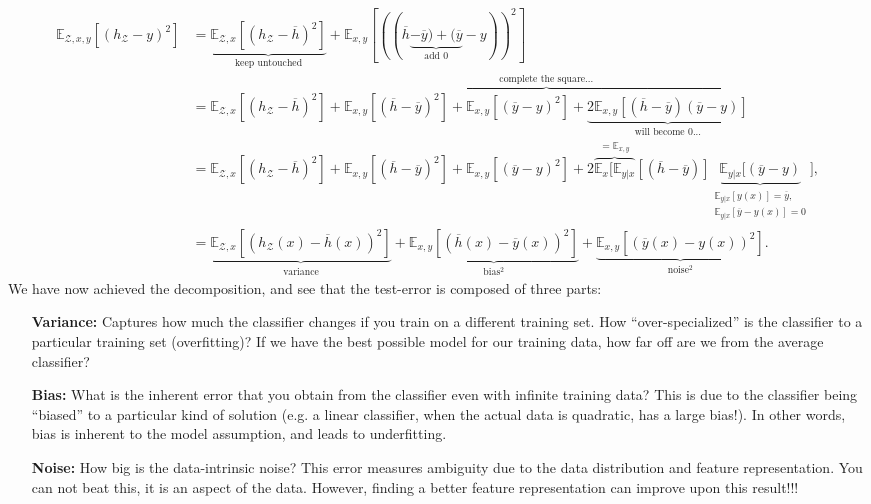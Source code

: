 \documentclass{article}
\begin{document}
\begin{align}
    \mathbb{E}_{\mathcal{Z},x,y}[(h_\mathcal{Z}-y)^2] & = \underbrace{\mathbb{E}_{\mathcal{Z},x}[(h_\mathcal{Z} - \overline{h})^2]}_\text{keep untouched} + \mathbb{E}_{x,y}[((\overline{h} \underbrace{-\overline{y})+(\overline{y}}_\text{add 0} - y))^2]\\
    & = \mathbb{E}_{\mathcal{Z},x}[(h_\mathcal{Z} - \overline{h})^2] + \overbrace{\mathbb{E}_{x,y}[(\overline{h} -\overline{y})^2]+\mathbb{E}_{x,y}[(\overline{y} - y)^2] + \underbrace{2\mathbb{E}_{x,y}[(\overline{h} -\overline{y})(\overline{y} - y)]}_\text{will become 0...}}^\text{complete the square...}\\
    & = \mathbb{E}_{\mathcal{Z},x}[(h_\mathcal{Z} - \overline{h})^2] + \mathbb{E}_{x,y}[(\overline{h} -\overline{y})^2]+\mathbb{E}_{x,y}[(\overline{y} - y)^2] + 2\overbrace{\mathbb{E}_{x}[\mathbb{E}_{y|x}}^{=\mathbb{E}_{x,y}}[(\overline{h} -\overline{y})]\underbrace{\mathbb{E}_{y|x}[(\overline{y} - y)}_{\substack{\mathbb{E}_{y|x}[y(x)]=\overline{y},\\\mathbb{E}_{y|x}[\overline{y}-y(x)]=0}}],\\
    &=\underbrace{\mathbb{E}_{\mathcal{Z},x}[(h_\mathcal{Z}(x) - \overline{h}(x))^2]}_\text{variance} + \underbrace{\mathbb{E}_{x,y}[(\overline{h}(x) -\overline{y}(x))^2]}_\text{bias$^2$} + \underbrace{\mathbb{E}_{x,y}[(\overline{y}(x) - y(x))^2]}_\text{noise$^2$}.
\end{align}
We have now achieved the decomposition, and see that the test-error is composed of three parts:
\begin{itemize}\itemsep0em
    \item[\textbf{Variance:}] Captures how much the classifier changes if you train on a different training set. How ``over-specialized'' is the classifier to a particular training set (overfitting)? If we have the best possible model for our training data, how far off are we from the average classifier? 

    \item[\textbf{Bias:}] What is the inherent error that you obtain from the classifier even with infinite training data? This is due to the classifier being ``biased'' to a particular kind of solution (e.g. a linear classifier, when the actual data is quadratic, has a large bias!). In other words, bias is inherent to the model assumption, and leads to underfitting.

    \item[\textbf{Noise:}] How big is the data-intrinsic noise? This error measures ambiguity due to the data distribution and feature representation. You can not beat this, it is an aspect of the data. However, finding a better feature representation can improve upon this result!!!
\end{itemize}
\end{document}
